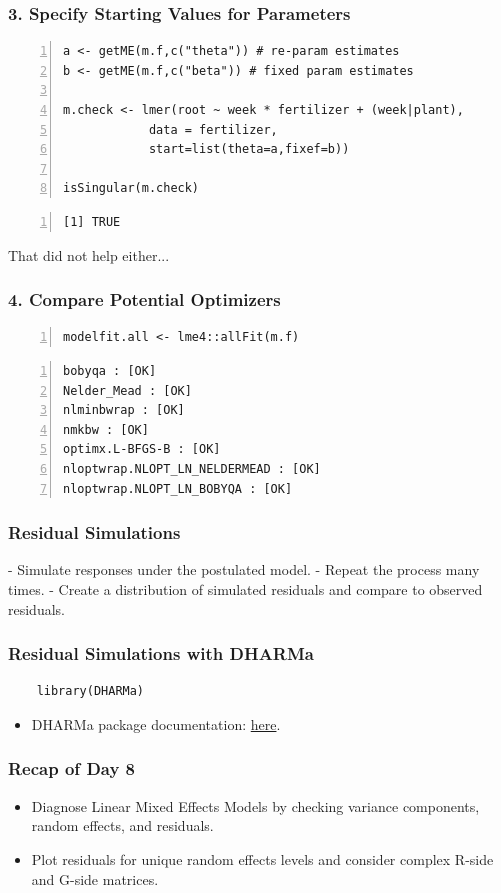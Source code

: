 \documentclass{beamer}
\begin{document}
\begin{frame}[fragile]
    \frametitle{3. Specify Starting Values for Parameters}
    \scriptsize
    \begin{Verbatim}[numbers=left,numbersep=6pt,frame=single]
a <- getME(m.f,c("theta")) # re-param estimates
b <- getME(m.f,c("beta")) # fixed param estimates

m.check <- lmer(root ~ week * fertilizer + (week|plant), 
            data = fertilizer,
            start=list(theta=a,fixef=b))

isSingular(m.check)
    \end{Verbatim}
    \begin{Verbatim}[numbers=left,numbersep=6pt,frame=single]
[1] TRUE
    \end{Verbatim}
     \normalsize That did not help either...
    
\end{frame}

\begin{frame}[fragile]
    \frametitle{4. Compare Potential Optimizers}
    \scriptsize
    \begin{Verbatim}[numbers=left,numbersep=6pt,frame=single]
modelfit.all <- lme4::allFit(m.f)    
    \end{Verbatim}
    \begin{Verbatim}[numbers=left,numbersep=6pt,frame=single]
bobyqa : [OK]
Nelder_Mead : [OK]
nlminbwrap : [OK]
nmkbw : [OK]
optimx.L-BFGS-B : [OK]
nloptwrap.NLOPT_LN_NELDERMEAD : [OK]
nloptwrap.NLOPT_LN_BOBYQA : [OK]        
    \end{Verbatim}
\end{frame}

\begin{frame}
    \frametitle{Residual Simulations}
    - Simulate responses under the postulated model.
    - Repeat the process many times.
    - Create a distribution of simulated residuals and compare to observed residuals.
\end{frame}

\begin{frame}[fragile]
    \frametitle{Residual Simulations with DHARMa}
    \lstset{style=Rstyle}
    \begin{lstlisting}
    library(DHARMa)
    \end{lstlisting}
    \begin{itemize}
        \item DHARMa package documentation: \href{https://cran.r-project.org/web/packages/DHARMa/vignettes/DHARMa.html}{here}.
    \end{itemize}
\end{frame}

\begin{frame}
    \frametitle{Recap of Day 8}
    \begin{itemize}
        \item Diagnose Linear Mixed Effects Models by checking variance components, random effects, and residuals.
        \item Plot residuals for unique random effects levels and consider complex R-side and G-side matrices.
    \end{itemize}
\end{frame}
\end{document}
